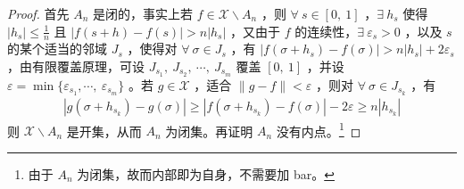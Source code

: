 \begin{enumerate}[leftmargin=2cm, label=\arabic*]
\begin{proof}
    首先 $A_n$ 是闭的，事实上若 $f\in \mathscr{X}\backslash A_n$ ，则 $\forall\ s\in[0,\ 1]$ ，$\exists\ h_s$ 使得 $|h_s|\leqslant \frac{1}{n}$ 且 $|f(s+h) - f(s)| > n|h_s|$ ，又由于 $f$ 的连续性，$\exists\ \varepsilon_s > 0$ ，以及 $s$ 的某个适当的邻域 $J_{s}$ ，使得对 $\forall\ \sigma\in J_s$ ，有 $|f(\sigma + h_s) - f(\sigma)| > n|h_s| + 2 \varepsilon_s$ ，由有限覆盖原理，可设 $J_{s_1},\ J_{s_2},\ \cdots,\ J_{s_m}$ 覆盖 $[0,\ 1]$ ，并设 $\varepsilon = \min\{\varepsilon_{s_1},\cdots,\ \varepsilon_{s_m}\}$ 。若 $g\in \mathscr{X}$ ，适合 $\|g-f\| < \varepsilon$ ，则对 $\forall\ \sigma\in J_{s_k}$ ，有
\begin{align*}
    |g(\sigma+h_{s_k}) - g(\sigma)| \geqslant |f(\sigma + h_{s_k}) - f(\sigma)| - 2\varepsilon \geqslant n|h_{s_k}| 
\end{align*}
则 $\mathscr{X}\backslash A_n$ 是开集，从而 $A_n$ 为闭集。再证明 $A_n$ 没有内点。\footnote{由于 $A_n$ 为闭集，故而内部即为自身，不需要加 bar。}


\end{proof}
\end{enumerate}
